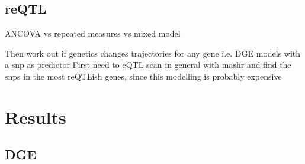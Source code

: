 \begin{outline}
%
%
%
%

\subsection{reQTL}



ANCOVA vs repeated measures vs mixed model


Then work out if genetics changes trajectories for any gene i.e. DGE models with a snp as predictor
First need to eQTL scan in general with mashr and find the snps in the most reQTLish genes, since this modelling is probably expensive

\section{Results}

\subsection{DGE}


\end{outline}
